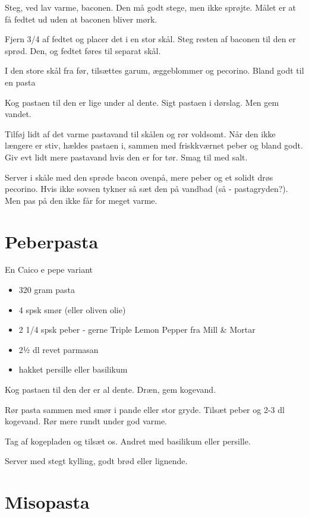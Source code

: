 \documentclass[
]{book}
\providecommand{\tightlist}{%
  \setlength{\itemsep}{0pt}\setlength{\parskip}{0pt}}
\begin{document}
Steg, ved lav varme, baconen. Den må godt stege, men ikke sprøjte.
Målet er at få fedtet ud uden at baconen bliver mørk.

Fjern 3/4 af fedtet og placer det i en stor skål.
Steg resten af baconen til den er sprød. Den, og fedtet føres til separat skål.

I den store skål fra før, tilsættes garum, æggeblommer og pecorino.
Bland godt til en pasta

Kog pastaen til den er lige under al dente. Sigt pastaen i dørslag.
Men gem vandet.

Tilføj lidt af det varme pastavand til skålen og rør voldsomt.
Når den ikke længere er stiv, hældes pastaen i, sammen med friskkværnet
peber og bland godt. Giv evt lidt mere pastavand hvis den er for tør.
Smag til med salt.

Server i skåle med den sprøde bacon ovenpå, mere peber og et solidt
drøs pecorino.
Hvis ikke sovsen tykner så sæt den på vandbad (så - pastagryden?).
Men pas på den ikke får for meget varme.

\section{Peberpasta}\label{peberpasta}

En Caico e pepe variant

\begin{itemize}
\tightlist
\item
  320 gram pasta
\item
  4 spsk smør (eller oliven olie)
\item
  2 1/4 spsk peber - gerne Triple Lemon Pepper fra Mill \& Mortar
\item
  2½ dl revet parmasan
\item
  hakket persille eller basilikum
\end{itemize}

Kog pastaen til den der er al dente. Dræn, gem kogevand.

Rør pasta sammen med smør i pande eller stor gryde. Tilsæt peber og 2-3 dl
kogevand. Rør mere rundt under god varme.

Tag af kogepladen og tilsæt os. Andret med basilikum eller persille.

Server med stegt kylling, godt brød eller lignende.

\section{Misopasta}\label{misopasta}
\end{document}

